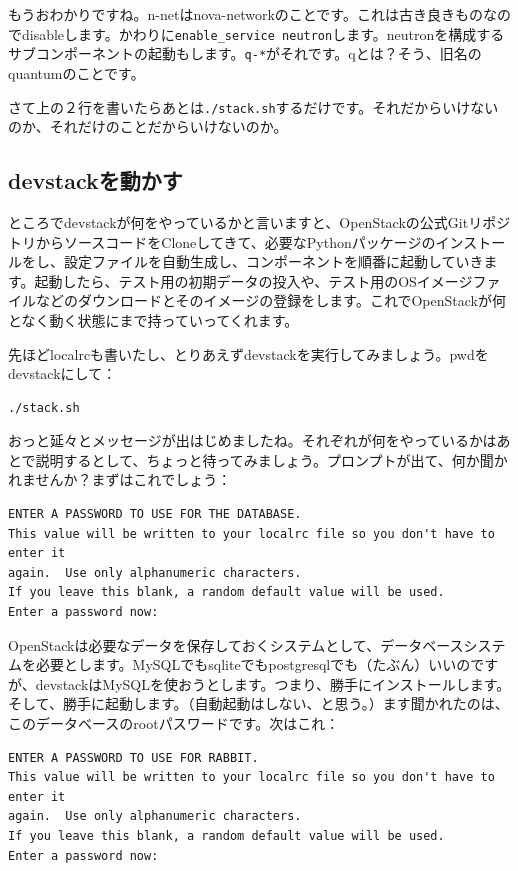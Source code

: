 \documentclass[9pt,b5paper,tombo,openany,dvipdfmx]{jsbook}
\begin{document}
もうおわかりですね。n-netはnova-networkのことです。これは古き良きものなのでdisableします。かわりに\verb|enable_service neutron|します。neutronを構成するサブコンポーネントの起動もします。\verb|q-*|がそれです。qとは？そう、旧名のquantumのことです。

さて上の２行を書いたらあとは\verb|./stack.sh|するだけです。それだからいけないのか、それだけのことだからいけないのか。

\subsection{devstackを動かす}

ところでdevstackが何をやっているかと言いますと、OpenStackの公式GitリポジトリからソースコードをCloneしてきて、必要なPythonパッケージのインストールをし、設定ファイルを自動生成し、コンポーネントを順番に起動していきます。起動したら、テスト用の初期データの投入や、テスト用のOSイメージファイルなどのダウンロードとそのイメージの登録をします。これでOpenStackが何となく動く状態にまで持っていってくれます。

先ほどlocalrcも書いたし、とりあえずdevstackを実行してみましょう。pwdをdevstackにして：

\begin{lstlisting}
./stack.sh
\end{lstlisting}

おっと延々とメッセージが出はじめましたね。それぞれが何をやっているかはあとで説明するとして、ちょっと待ってみましょう。プロンプトが出て、何か聞かれませんか？まずはこれでしょう：

\begin{lstlisting}
ENTER A PASSWORD TO USE FOR THE DATABASE.
This value will be written to your localrc file so you don't have to enter it
again.  Use only alphanumeric characters.
If you leave this blank, a random default value will be used.
Enter a password now:
\end{lstlisting}

OpenStackは必要なデータを保存しておくシステムとして、データベースシステムを必要とします。MySQLでもsqliteでもpostgresqlでも（たぶん）いいのですが、devstackはMySQLを使おうとします。つまり、勝手にインストールします。そして、勝手に起動します。（自動起動はしない、と思う。）ます聞かれたのは、このデータベースのrootパスワードです。次はこれ：

\begin{lstlisting}
ENTER A PASSWORD TO USE FOR RABBIT.
This value will be written to your localrc file so you don't have to enter it
again.  Use only alphanumeric characters.
If you leave this blank, a random default value will be used.
Enter a password now:
\end{lstlisting}
\end{document}
